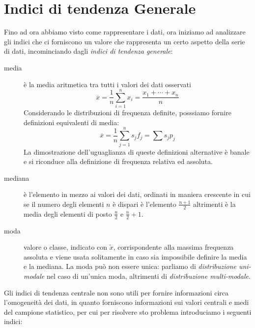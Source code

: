 \documentclass[a4paper,12pt, oneside]{book}
\begin{document}
\section{Indici di tendenza Generale}
Fino ad ora abbiamo visto come rappresentare i dati, ora iniziamo ad analizzare gli indici
che ci forniscono un valore che rappresenta un certo aspetto della serie di dati, 
incominciando dagli \emph{indici di tendenza generale}:
\begin{description}
    \item [media] è la media aritmetica tra tutti i valori dei dati osservati 
        \[ \overline{x} = \frac{1}{n} \sum _{i = 1} ^ n x_i = \frac{x_1 + \cdots + x_n}{n} \]
            Considerando le distribuzioni di frequenza definite, posssiamo fornire definizioni equivalenti di media:
                \[ \overline{x} = \frac{1}{n} \sum _{j = 1} ^ n s_j f_j = \sum s_j p_j \]
                La dimostrazione dell'uguaglianza di queste definizioni alternative è banale e si riconduce 
                alla definizione di frequenza relativa ed assoluta.

    \item [mediana] è l'elemento in mezzo ai valori dei dati, ordinati in maniera crescente
            in cui se il numero degli elementi $n$ è dispari è l'elemento $\frac{n + 1}{2}$
            altrimenti è la media degli elementi di posto $\frac{n}{2}$ e $\frac{n}{2} + 1$.

    \item [moda] valore o classe, indicato con $\widetilde{x}$, corrispondente alla massima frequenza assoluta
                 e viene usata solitamente in caso sia impossibile definire la media e la mediana.\newline
            La moda può non essere unica: parliamo di \emph{distribuzione uni-modale} nel caso di un'unica moda,
            altrimenti di \emph{distribuzione multi-modale}.
\end{description}
Gli indici di tendenza centrale non sono utili per fornire informazioni circa l'omogeneità dei dati, in quanto forniscono 
informazioni sui valori centrali e medi del campione statistico, per cui per risolvere sto problema
introduciamo i seguenti indici:
\end{document}
